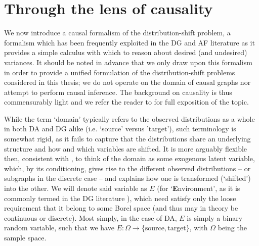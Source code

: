 \section{Through the lens of causality}\label{sec:lens-of-causality}

We now introduce a causal formalism of the distribution-shift problem, a formalism which has been
frequently exploited in the DG and AF literature as it provides a simple calculus with which to
reason about desired (and undesired) variances.
%
It should be noted in advance that we only draw upon this formalism in order to provide a unified
formulation of the distribution-shift problems considered in this thesis; we do not operate on the
domain of causal graphs nor attempt to perform causal inference. 
%
The background on causality is thus commensurably light and we refer the reader to
\cite{pearl2009causality} for full exposition of the topic.

While the term `domain' typically refers to the observed distributions as a whole in both DA and DG
alike (i.e. `source' versus 'target'), such terminology is somewhat rigid, as it fails to capture
that the distributions share an underlying structure and how and which variables are shifted.
%
It is more arguably flexible then, consistent with \citep{mooij2020joint}, to think of the domain
as some exogenous latent variable, which, by its conditioning, gives rise to the different observed
distributions -- or subgraphs in the discrete case -- and explains how one is transformed
(`shifted') into the other.
%
We will denote said variable as \(E\) (for `\textbf{E}nvironment', as it is commonly termed in the
DG literature \citep{arjovsky2019invariant}), which need satisfy only the loose requirement that it
belong to some Borel space (and thus may in theory be continuous or discrete).
%
Most simply, in the case of DA, \(E\) is simply a binary random variable, such that we have \(E:
\Omega \to \{ \text{source}, \text{target} \}\), with \( \Omega \) being the sample space.
%

